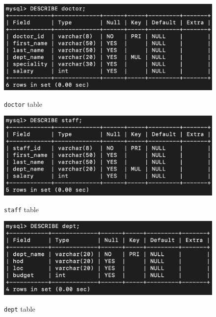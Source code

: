 \documentclass[12pt]{article}
\let\oldtexttt\texttt
\renewcommand{\texttt}[1]{
  \colorbox{bgcolor}{\oldtexttt{#1}}
  }
\begin{document}
\vspace{5mm}

\begin{figure}[!hbt]
    \centering
    \includegraphics[scale=0.85]{tables/4.png}
    \label{fig:my_label1}
    \caption{\texttt{doctor} table}
\end{figure}

\newpage

\begin{figure}[!hbt]
    \centering
    \includegraphics[scale=0.85]{tables/5.png}
    \label{fig:data}
    \caption{\texttt{staff} table}
\end{figure}

\vspace{5mm}

\begin{figure}[!hbt]
    \centering
    \includegraphics[scale=0.85]{tables/6.png}
    \label{fig:my_label1}
    \caption{\texttt{dept} table}
\end{figure}
\end{document}

